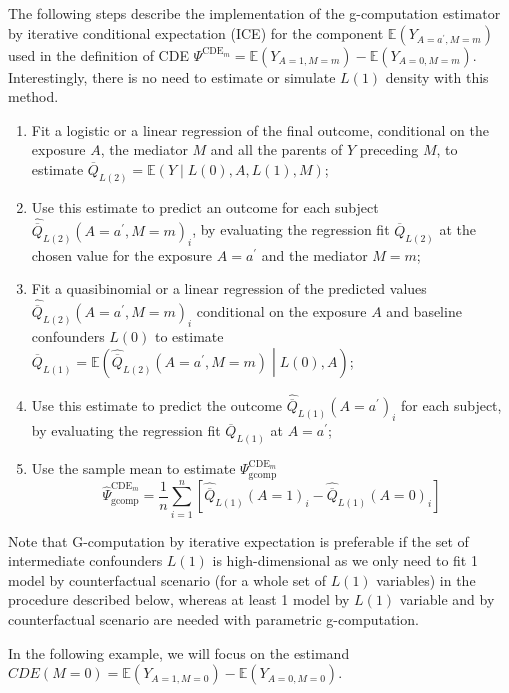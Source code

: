 \documentclass[
]{book}
\begin{document}
The following steps describe the implementation of the g-computation estimator by iterative conditional expectation (ICE) for the component \(\mathbb{E}(Y_{A=a^\prime,M=m})\) used in the definition of CDE \(\Psi^{\text{CDE}_m} = \mathbb{E}(Y_{A=1,M=m}) - \mathbb{E}(Y_{A=0,M=m})\). Interestingly, there is no need to estimate or simulate \(L(1)\) density with this method.

\begin{enumerate}
\def\labelenumi{\arabic{enumi}.}
\item
  Fit a logistic or a linear regression of the final outcome, conditional on the exposure \(A\), the mediator \(M\) and all the parents of \(Y\) preceding \(M\), to estimate \(\overline{Q}_{L(2)} = \mathbb{E}(Y \mid L(0),A,L(1),M)\);
\item
  Use this estimate to predict an outcome for each subject \(\hat{\overline{Q}}_{L(2)}(A=a^\prime,M=m)_i\), by evaluating the regression fit \(\overline{Q}_{L(2)}\) at the chosen value for the exposure \(A=a^\prime\) and the mediator \(M=m\);
\item
  Fit a quasibinomial or a linear regression of the predicted values \(\hat{\overline{Q}}_{L(2)}(A=a^\prime,M=m)_i\) conditional on the exposure \(A\) and baseline confounders \(L(0)\) to estimate \(\overline{Q}_{L(1)} = \mathbb{E}\left(\hat{\overline{Q}}_{L(2)}(A=a^\prime,M=m) \middle| L(0),A\right)\);
\item
  Use this estimate to predict the outcome \(\hat{\overline{Q}}_{L(1)}(A=a^\prime)_i\) for each subject, by evaluating the regression fit \(\overline{Q}_{L(1)}\) at \(A=a^\prime\);
\item
  Use the sample mean to estimate \(\Psi^{\text{CDE}_m}_{\text{gcomp}}\)
  \begin{equation}
  \hat{\Psi}^{\text{CDE}_m}_{\text{gcomp}} = \frac{1}{n} \sum_{i=1}^n \left[ \hat{\overline{Q}}_{L(1)}(A=1)_i - \hat{\overline{Q}}_{L(1)}(A=0)_i \right]
  \end{equation}
\end{enumerate}

Note that G-computation by iterative expectation is preferable if the set of intermediate confounders \(L(1)\) is high-dimensional as we only need to fit 1 model by counterfactual scenario (for a whole set of \(L(1)\) variables) in the procedure described below, whereas at least 1 model by \(L(1)\) variable and by counterfactual scenario are needed with parametric g-computation.

In the following example, we will focus on the estimand \(CDE(M=0) = \mathbb{E}(Y_{A=1,M=0}) - \mathbb{E}(Y_{A=0,M=0})\).
\end{document}
